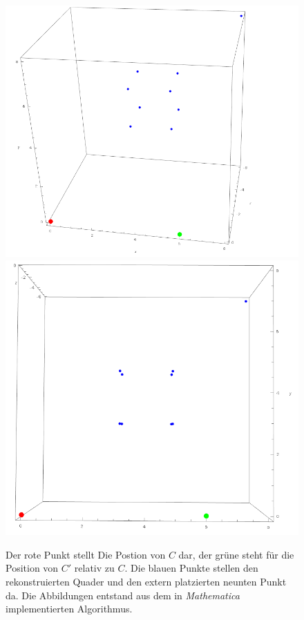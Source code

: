 \begin{figure}[!htb]
	\includegraphics[width=\linewidth]{images/MinimalBeispiel_reconstructed.png}
	\label{fig:Quader1}
	\endminipage\hfill
	\includegraphics[width=\linewidth]{images/MinimalBeispiel_reconstructed_3.png}
	\label{fig:Quader2}
	\endminipage\hfill
	\caption[Programmplot der rekonstruierten Szene]{Der rote Punkt stellt Die Postion von $C$ dar, der grüne steht für die Position von $C'$ relativ zu $C$. Die blauen Punkte stellen den rekonstruierten Quader und den extern platzierten neunten Punkt da. Die Abbildungen entstand aus dem in \textit{Mathematica}\cite{Mathematica} implementierten Algorithmus.}
\end{figure}
\pagebreak


